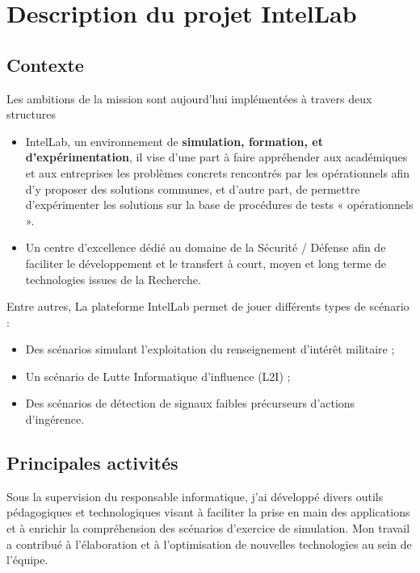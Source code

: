 \section{Description du projet IntelLab}
\subsection{Contexte}

Les ambitions de la mission sont aujourd’hui implémentées à travers deux structures

\begin{itemize}\addtolength{\itemsep}{-0.35\baselineskip}
  \item IntelLab, un environnement de \textbf{simulation, formation, et d’expérimentation}, il vise d’une part à faire appréhender aux académiques et aux entreprises les problèmes concrets rencontrés par les opérationnels afin d’y proposer des solutions communes, et d’autre part, de permettre d’expérimenter les solutions sur la base de procédures de tests « opérationnels ».
  \item Un centre d’excellence dédié au domaine de la Sécurité / Défense afin de faciliter le développement et le transfert à court, moyen et long terme de technologies issues de la Recherche.
\end{itemize}

\noindent Entre autres, La plateforme IntelLab permet de jouer différents types de scénario :

\begin{itemize}\addtolength{\itemsep}{-0.35\baselineskip}%
  \item Des scénarios simulant l'exploitation du renseignement d'intérêt militaire ;
  \item Un scénario de Lutte Informatique d'influence (L2I) ;
  \item Des scénarios de détection de signaux faibles précurseurs d'actions d'ingérence.
\end{itemize}

\subsection{Principales activités}


Sous la supervision du responsable informatique, j'ai développé divers outils pédagogiques et technologiques visant à faciliter la prise en main des applications et à enrichir la compréhension des scénarios d'exercice de simulation. Mon travail a contribué à l'élaboration et à l'optimisation de nouvelles technologies au sein de l'équipe.

